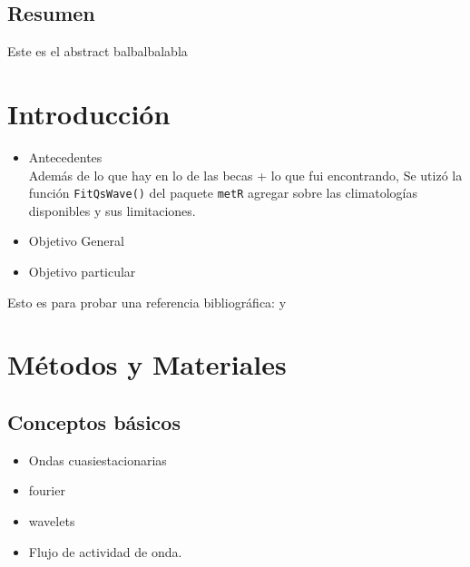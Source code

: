 \documentclass[spanish,a4paper,12pt,oneside]{book}
\providecommand{\tightlist}{%
  \setlength{\itemsep}{0pt}\setlength{\parskip}{0pt}}
\begin{document}
\begin{center}\begin{minipage}{\dimexpr\paperwidth-7cm}
\chapter*{Resumen}
Este es el abstract balbalbalabla
\end{minipage}
\end{center}

\setcounter{tocdepth}{3} \tableofcontents

\listoffigures
\newpage

\mainmatter

\chapter{Introducción}\label{introduccion}

\textcite{Wheeler2004}

\textcite{James}

\cite{James} \citep{James, R-metR}

\begin{itemize}
\tightlist
\item
  Antecedentes\\
  Además de lo que hay en lo de las becas + lo que fui encontrando, Se
  utizó la función \texttt{FitQsWave()} del paquete \texttt{metR}
  \autocite{R-metR} agregar sobre las climatologías disponibles y sus
  limitaciones.
\item
  Objetivo General
\item
  Objetivo particular
\end{itemize}

Esto es para probar una referencia bibliográfica: \textcite{Vera2004} y
\autocite{Vera2004}

\chapter{Métodos y Materiales}\label{metodos-y-materiales}


\section{Conceptos básicos}\label{conceptos-basicos}

\begin{itemize}
\tightlist
\item
  Ondas cuasiestacionarias
\item
  fourier
\item
  wavelets
\item
  Flujo de actividad de onda.
\end{itemize}
\end{document}
